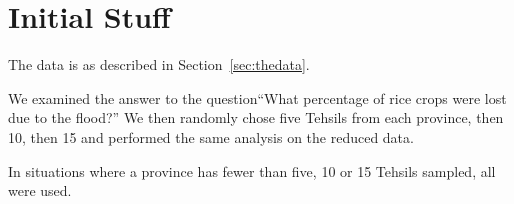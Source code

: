 \section{Initial Stuff}
\label{sec:initial}
The data is as described in Section~\ref{sec:thedata}.

We examined the answer to the question``What percentage of rice crops were lost due to the flood?''  We then randomly chose five Tehsils from each province, then 10, then 15 and performed the same analysis on the reduced data.

In situations where a province has fewer than five, 10 or 15 Tehsils sampled, all were used.
